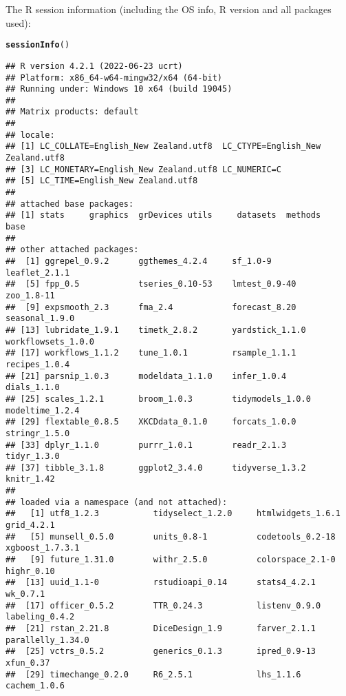 \documentclass{article}\usepackage[]{graphicx}\usepackage[]{xcolor}
\makeatletter
\newcommand{\hlstd}[1]{\textcolor[rgb]{0.345,0.345,0.345}{#1}}%
\newcommand{\hlkwd}[1]{\textcolor[rgb]{0.737,0.353,0.396}{\textbf{#1}}}%
\newenvironment{kframe}{%
 \def\at@end@of@kframe{}%
 \ifinner\ifhmode%
  \def\at@end@of@kframe{\end{minipage}}%
  \begin{minipage}{\columnwidth}%
 \fi\fi%
 \def\FrameCommand##1{\hskip\@totalleftmargin \hskip-\fboxsep
 \colorbox{shadecolor}{##1}\hskip-\fboxsep
     \hskip-\linewidth \hskip-\@totalleftmargin \hskip\columnwidth}%
 \MakeFramed {\advance\hsize-\width
   \@totalleftmargin\z@ \linewidth\hsize
   \@setminipage}}%
 {\par\unskip\endMakeFramed%
 \at@end@of@kframe}
\newenvironment{knitrout}{}{} %
\makeatother
\begin{document}
The R session information (including the OS info, R version and all
packages used):

\begin{knitrout}
\color{fgcolor}\begin{kframe}
\begin{alltt}
\hlkwd{sessionInfo}\hlstd{()}
\end{alltt}
\begin{verbatim}
## R version 4.2.1 (2022-06-23 ucrt)
## Platform: x86_64-w64-mingw32/x64 (64-bit)
## Running under: Windows 10 x64 (build 19045)
## 
## Matrix products: default
## 
## locale:
## [1] LC_COLLATE=English_New Zealand.utf8  LC_CTYPE=English_New Zealand.utf8   
## [3] LC_MONETARY=English_New Zealand.utf8 LC_NUMERIC=C                        
## [5] LC_TIME=English_New Zealand.utf8    
## 
## attached base packages:
## [1] stats     graphics  grDevices utils     datasets  methods   base     
## 
## other attached packages:
##  [1] ggrepel_0.9.2      ggthemes_4.2.4     sf_1.0-9           leaflet_2.1.1     
##  [5] fpp_0.5            tseries_0.10-53    lmtest_0.9-40      zoo_1.8-11        
##  [9] expsmooth_2.3      fma_2.4            forecast_8.20      seasonal_1.9.0    
## [13] lubridate_1.9.1    timetk_2.8.2       yardstick_1.1.0    workflowsets_1.0.0
## [17] workflows_1.1.2    tune_1.0.1         rsample_1.1.1      recipes_1.0.4     
## [21] parsnip_1.0.3      modeldata_1.1.0    infer_1.0.4        dials_1.1.0       
## [25] scales_1.2.1       broom_1.0.3        tidymodels_1.0.0   modeltime_1.2.4   
## [29] flextable_0.8.5    XKCDdata_0.1.0     forcats_1.0.0      stringr_1.5.0     
## [33] dplyr_1.1.0        purrr_1.0.1        readr_2.1.3        tidyr_1.3.0       
## [37] tibble_3.1.8       ggplot2_3.4.0      tidyverse_1.3.2    knitr_1.42        
## 
## loaded via a namespace (and not attached):
##   [1] utf8_1.2.3           tidyselect_1.2.0     htmlwidgets_1.6.1    grid_4.2.1          
##   [5] munsell_0.5.0        units_0.8-1          codetools_0.2-18     xgboost_1.7.3.1     
##   [9] future_1.31.0        withr_2.5.0          colorspace_2.1-0     highr_0.10          
##  [13] uuid_1.1-0           rstudioapi_0.14      stats4_4.2.1         wk_0.7.1            
##  [17] officer_0.5.2        TTR_0.24.3           listenv_0.9.0        labeling_0.4.2      
##  [21] rstan_2.21.8         DiceDesign_1.9       farver_2.1.1         parallelly_1.34.0   
##  [25] vctrs_0.5.2          generics_0.1.3       ipred_0.9-13         xfun_0.37           
##  [29] timechange_0.2.0     R6_2.5.1             lhs_1.1.6            cachem_1.0.6        

\end{verbatim}
\end{kframe}
\end{knitrout}
\end{document}

